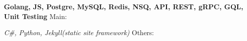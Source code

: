 \begin{cventries}

    
\cventry
    {\textbf{Golang, JS, Postgre, MySQL, Redis, NSQ, API, REST, gRPC, GQL, Unit Testing} }
    {Main:}
    {}
    {}
    {
        \iffalse
        \begin{cvitems}
            \item Languages: Go, PHP, C\#, HTML/CSS, Javascript. 
            \item MySQL, ASP.Net, Postman, Apache Tomcat, Linux.
            \item Web services, REST APIs, Auths, SQL, Unit testing.
        \end{cvitems}
        \fi
    }


\cventry
    {\textit{C\#, Python, Jekyll(static site framework)} }
    {Others:}
    {}
    {}
    {
        \iffalse
        \begin{cvitems}
            \item Nodejs/expressjs, Java, Python, Laravel, Wordpress, Jekyll.
        \end{cvitems}
        \fi
    }
\end{cventries}
